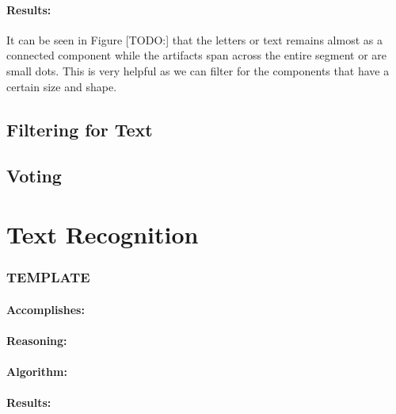 \paragraph*{Results:}\mbox{}\par
It can be seen in Figure [TODO:] that the letters or text remains almost as a connected component while the artifacts span across the entire segment or are small dots. This is very helpful as we can filter for the components that have a certain size and shape.

\subsection{Filtering for Text}

\subsection{Voting}

\section{Text Recognition}\label{sec:text-recognition}



\subsubsection{TEMPLATE}
\label{subsubsec:TEMPLATE}

\paragraph*{Accomplishes:}\mbox{}\par

\paragraph*{Reasoning:}\mbox{}\par

\paragraph*{Algorithm:}\mbox{}\par

\paragraph*{Results:}\mbox{}\par
